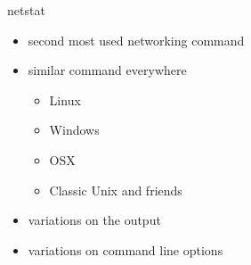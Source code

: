 \begin{frame}
	{netstat}
	
	\begin{itemize}
	\item second most used networking command 
	\item similar command everywhere
		\begin{itemize}
		\item Linux
		\item Windows
		\item OSX
		\item Classic Unix and friends 
		\end{itemize}
	\item variations on the output
	\item variations on command line options 

	\end{itemize}
\end{frame}

\cprotect\note{ 

}

